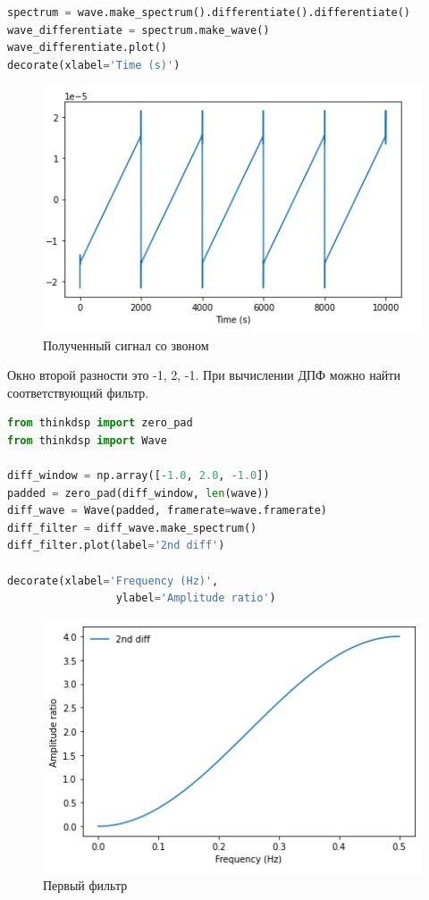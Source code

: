 \begin{lstlisting}[language=Python]
spectrum = wave.make_spectrum().differentiate().differentiate()
wave_differentiate = spectrum.make_wave()
wave_differentiate.plot()
decorate(xlabel='Time (s)')
\end{lstlisting}

\begin{figure}[H]
	\begin{center}
		\includegraphics[scale=1]{fig/lab09/lab09_15.png}
		\caption{Полученный сигнал со звоном}
	\end{center}
\end{figure}

Окно второй разности это -1, 2, -1. При вычислении ДПФ можно найти соответствующий фильтр.

\begin{lstlisting}[language=Python]
from thinkdsp import zero_pad
from thinkdsp import Wave

diff_window = np.array([-1.0, 2.0, -1.0])
padded = zero_pad(diff_window, len(wave))
diff_wave = Wave(padded, framerate=wave.framerate)
diff_filter = diff_wave.make_spectrum()
diff_filter.plot(label='2nd diff')

decorate(xlabel='Frequency (Hz)',
                 ylabel='Amplitude ratio')
\end{lstlisting}

\begin{figure}[H]
	\begin{center}
		\includegraphics[scale=1]{fig/lab09/lab09_16.png}
		\caption{Первый фильтр}
	\end{center}
\end{figure}

